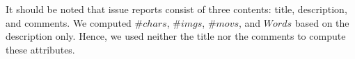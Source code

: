 It should be noted that issue reports consist of three contents: 
title, description, and comments. 
We computed $\#chars$, $\#imgs$, $\#movs$, and $Words$ based on the description only. 
Hence, we used neither the title nor the comments 
to compute these attributes.


